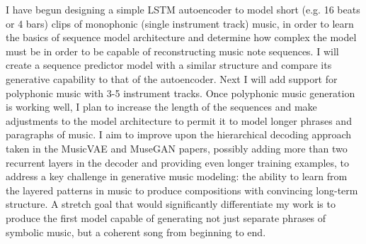 \documentclass[sigconf,authorversion]{acmart}
\begin{document}
I have begun designing a simple LSTM autoencoder to model short
(e.g. 16 beats or 4 bars) clips of monophonic (single instrument
track) music, in order to learn the basics of sequence model
architecture and determine how complex the model must be in order to
be capable of reconstructing music note sequences. I will create a
sequence predictor model with a similar structure and compare its
generative capability to that of the autoencoder. Next I will add
support for polyphonic music with 3-5 instrument tracks. Once
polyphonic music generation is working well, I plan to increase the
length of the sequences and make adjustments to the model architecture
to permit it to model longer phrases and paragraphs of music. I aim to
improve upon the hierarchical decoding approach taken in the MusicVAE
\cite{roberts_hierarchical_2018} and MuseGAN \cite{dong2017musegan}
papers, possibly adding more than two recurrent layers in the decoder
and providing even longer training examples, to address a key
challenge in generative music modeling: the ability to learn from the
layered patterns in music to produce compositions with convincing
long-term structure. A stretch goal that would significantly
differentiate my work is to produce the first model capable of
generating not just separate phrases of symbolic music, but a coherent
song from beginning to end.



\end{document}

